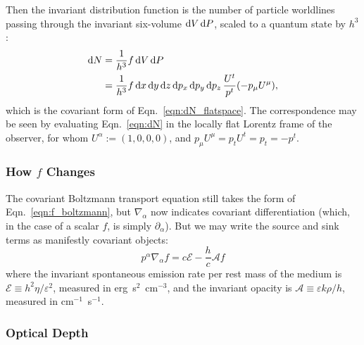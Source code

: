 Then the invariant distribution function is the number of particle worldlines
passing through the invariant six-volume $\mathrm{d} V\,\mathrm{d} P$, scaled to a quantum
state by $h^3$:
\begin{align}
  \label{eqn:dN_covariant}
  \mathrm{d} N &= \frac{1}{h^3} f\, \mathrm{d} V \, \mathrm{d} P\\
  \label{eqn:dN}
  &= \frac{1}{h^3} f\,
  \mathrm{d} x\,\mathrm{d} y\,\mathrm{d} z\, \mathrm{d} p_x\, \mathrm{d} p_y\, \mathrm{d} p_z\,
  \frac{U^t}{p^t} (-p_\mu U^\mu),
\end{align}
which is the covariant form of Eqn.~\ref{eqn:dN_flatspace}. The correspondence
may be seen by evaluating Eqn.~\ref{eqn:dN} in the locally flat Lorentz frame of
the observer, for whom $U^\alpha:=(1,0,0,0)$, and
$p_\mu U^\mu=p_tU^t=p_t=-p^t$.

\subsubsection{How $f$ Changes}
The covariant Boltzmann transport equation still takes the form of
Eqn.~\ref{eqn:f_boltzmann}, but $\nabla_\alpha$ now indicates covariant
differentiation (which, in the case of a scalar $f$, is simply
$\partial_\alpha$). But we may write the source and sink terms as
manifestly covariant objects:
\begin{equation}
  p^\alpha \nabla_\alpha f = c \mathcal{E} - \frac{h}{c} \mathcal{A} f
\end{equation}
where the invariant spontaneous emission rate per rest mass of the medium is
$\mathcal{E}\equiv h^2\eta/\varepsilon^2$, measured in erg~s$^2$~cm$^{-3}$,
and the invariant opacity is
$\mathcal{A}\equiv \varepsilon k \rho/h$, measured in cm$^{-1}$~s$^{-1}$.

\subsubsection{Optical Depth}
